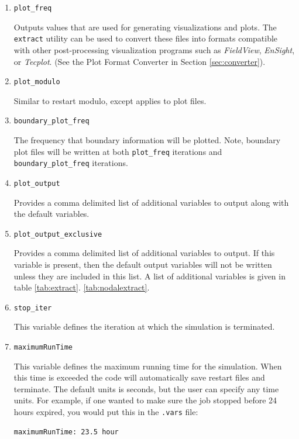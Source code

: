 \documentclass{article}
\begin{document}
\begin{enumerate}
\item {\tt plot\_freq}

Outputs values that are used for generating visualizations and plots.
The {\tt extract} utility can be used to convert these files into
formats compatible with other post-processing visualization programs
such as {\em FieldView}, {\em EnSight}, or {\em Tecplot}. (See the Plot Format Converter in Section
\ref{sec:converter}).

\item {\tt plot\_modulo}

Similar to restart modulo, except applies to plot files.

\item {\tt boundary\_plot\_freq}

  The frequency that boundary information will be plotted.  Note,
  boundary plot files will be written at both {\tt plot\_freq}
  iterations and {\tt boundary\_plot\_freq} iterations.

\item {\tt plot\_output}

  Provides a comma delimited list of additional variables to output
  along with the default variables.  

\item {\tt plot\_output\_exclusive}

  Provides a comma delimited list of additional variables to output.
  If this variable is present, then the default output variables will
  not be written unless they are included in this list.  A list of
  additional variables is given in table \ref{tab:extract}. %
  \ref{tab:nodalextract}.
  
\item {\tt stop\_iter}

  This variable defines the iteration at which the simulation is terminated.

\item {\tt maximumRunTime}

  This variable defines the maximum running time for the
  simulation.  When this time is exceeded the code will automatically
  save restart files and terminate.  The default units
  is seconds, but the user can specify any time units.  For
  example, if one wanted to make sure the job stopped before 24 hours
  expired, you would put this in the {\tt .vars} file:
\begin{verbatim}
maximumRunTime: 23.5 hour
\end{verbatim}


\end{enumerate}
\end{document}
